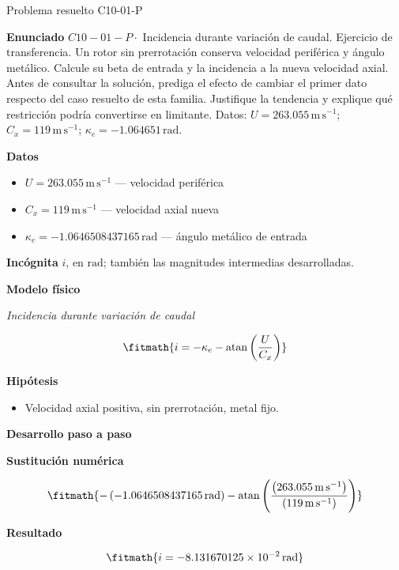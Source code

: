 \documentclass[10pt,openany]{book}
\begin{document}
\begin{studiumworked}{Problema resuelto C10-01-P}


\noindent\textbf{Enunciado}
\(C10-01-P \cdot\) Incidencia durante variación de caudal. Ejercicio de transferencia. Un rotor sin prerrotación conserva velocidad periférica y ángulo metálico. Calcule su beta de entrada y la incidencia a la nueva velocidad axial. Antes de consultar la solución, prediga el efecto de cambiar el primer dato respecto del caso resuelto de esta familia. Justifique la tendencia y explique qué restricción podría convertirse en limitante. Datos: \(U=263.055\, \mathrm{m}\,\mathrm{s}^{-1}\); \(C_x=119\, \mathrm{m}\,\mathrm{s}^{-1}\); \(\kappa_e=-1.064651\, \mathrm{rad}\).

\noindent\textbf{Datos}
\begin{itemize}
\item $U = 263.055\,\mathrm{m}\,\mathrm{s}^{-1}$ — velocidad periférica
\item $C_x = 119\,\mathrm{m}\,\mathrm{s}^{-1}$ — velocidad axial nueva
\item $\kappa_e = -1.0646508437165\,\mathrm{rad}$ — ángulo metálico de entrada
\end{itemize}

\noindent\textbf{Incógnita}
$i$, en $\mathrm{rad}$; también las magnitudes intermedias desarrolladas.

\noindent\textbf{Modelo físico}

\noindent\textit{Incidencia durante variación de caudal}

\[
\fitmath{i=- \kappa_e - \operatorname{atan}{\left(\frac{U}{C_x} \right)}}
\]

\noindent\textbf{Hipótesis}
\begin{itemize}
\item Velocidad axial positiva, sin prerrotación, metal fijo.
\end{itemize}

\noindent\textbf{Desarrollo paso a paso}



\noindent\textbf{Sustitución numérica}

\[
\fitmath{- \left(-1.0646508437165\,\mathrm{rad}\right) - \operatorname{atan}{\left(\frac{\left(263.055\,\mathrm{m}\,\mathrm{s}^{-1}\right)}{\left(119\,\mathrm{m}\,\mathrm{s}^{-1}\right)} \right)}}
\]

\noindent\textbf{Resultado}

\[
\fitmath{i=-8.131670125\times10^{-2}\,\mathrm{rad}}
\]


\end{studiumworked}
\end{document}
